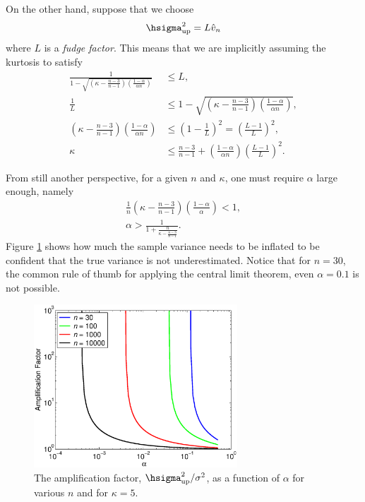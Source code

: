 \documentclass[12pt]{amsart}
\newcommand{\hv}{\hat{v}}
\begin{document}
On the other hand, suppose that we choose
\[
\hsigma^2_{\text{up}} = L \hv_{n}
\]
where $L$ is a \emph{fudge factor}.  This means that we are implicitly assuming the kurtosis to satisfy
\begin{align*}
\frac{1}
{1 - \sqrt{ \left ( \kappa  - \frac{n-3}{n-1}\right)\left(\frac{1-\alpha}{\alpha n }\right)}} &\le L, \\
\frac{1}{L} &\le 1 - \sqrt{ \left ( \kappa  - \frac{n-3}{n-1}\right)\left(\frac{1-\alpha}{\alpha n }\right)}, \\
\left ( \kappa  - \frac{n-3}{n-1}\right)\left(\frac{1-\alpha}{\alpha n }\right) &\le \left(1 - \frac{1}{L}\right)^2 = \left(\frac{L-1}{L}\right)^2,\\
\kappa  & \le \frac{n-3}{n-1} + \left(\frac{1-\alpha}{\alpha n }\right)\left(\frac{L-1}{L}\right)^2.
\end{align*}

From still another perspective, for a given $n$ and $\kappa$, one must require $\alpha$ large enough, namely
\begin{gather*}
\frac{1}{ n }\left(\kappa  - \frac{n-3}{n-1}\right)\left(\frac{1-\alpha}{\alpha}\right) < 1, \\
\alpha>\frac{1}{1+\frac{n}{\kappa  - \frac{n-3}{n-1}}}.
\end{gather*}
Figure  \ref{ampfacfig} shows how much the sample variance needs to be inflated to be confident that the true variance is not underestimated. Notice that for $n=30$, the common rule of thumb for applying the central limit theorem, even $\alpha=0.1$ is not possible.

\begin{figure}
\centering
\includegraphics[width=3in]{varianceampfac.eps}
\caption{The amplification factor, $\hsigma^2_{\text{up}}/\sigma^2$, as a function of $\alpha$ for various $n$ and for $\kappa=5$. \label{ampfacfig}}
\end{figure}
\end{document}
